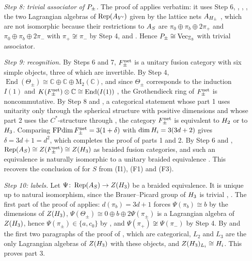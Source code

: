 \documentclass[leqno]{article}
\newcommand{\Cbb}{\ensuremath{\mathbb{C}}}
\newcommand{\M}{\mathrm{M}}
\let\cal\relax
\newcommand{\cal}{\mathcal}
\newcommand{\Z}{\ensuremath{\mathbb{Z}}}
\newcommand{\co}{\colon}
\newcommand{\ot}{\otimes}
\DeclareMathOperator{\Rep}{Rep}
\numberwithin{equation}{section}
\begin{document}
\emph{Step 8: trivial associator of $\cal P_\pm$.} The proof of \cite[Lemma 6.10]{ArhII} applies verbatim: it uses Step 6, \cite[Corollary 4.1 and Theorem 4.10]{DMNO13}, \cite[Proposition 2.2(5)]{ArhII}, \cite[Proposition 6.4]{BKL15}, the two Lagrangian algebras of $\Rep(\cal A_{V'})$ given by the lattice nets $\cal A_{H_\pm}$ \cite[Proposition 4.3(2) and Theorem 4.5]{ArhII}, which are not isomorphic because their restrictions to $\cal A_S$ are $\pi_0 \oplus \pi_b \oplus 2\pi_+$ and $\pi_0 \oplus \pi_b \oplus 2\pi_-$ with $\pi_+ \not\cong \pi_-$ by Step 4, \cite[Proposition 4.8]{DMNO13} and \cite[Lemma 6.7(2)]{ArhII}. Hence $\cal P_\pm \cong \mathrm{Vec}_{\Z_3}$ with trivial associator.

\emph{Step 9: recognition.} By Steps 6 and 7, $\cal F^{\mathrm{net}}_\pm$ is a unitary fusion category with six simple objects, three of which are invertible. By Step 4, $\operatorname{End}(\Theta_\pm) \cong \Cbb \oplus \Cbb \oplus \M_2(\Cbb)$, and since $\Theta_\pm$ corresponds to the induction $I(1)$ \cite[Lemma 3.1]{ArhII} and $K(\cal F^{\mathrm{net}}_\pm) \ot \Cbb \cong \operatorname{End}(I(1))$ \cite[Corollary 2.16]{Ost15}, the Grothendieck ring of $\cal F^{\mathrm{net}}_\pm$ is noncommutative. By Step 8 and \cite[Theorem 6.1]{ArhII}, a categorical statement whose part 1 uses unitarity only through the spherical structure with positive dimensions and whose part 2 uses the $C^*$-structure through \cite[Theorems 5.9 and 9.1]{Izu18}, the category $\cal F^{\mathrm{net}}_\pm$ is equivalent to $\cal H_2$ or to $\cal H_3$. Comparing $\operatorname{FPdim}\cal F^{\mathrm{net}}_\pm = 3(1+\delta)$ with $\dim\cal H_i = 3(3d+2)$ gives $\delta = 3d+1 = d^2$, which completes the proof of parts 1 and 2. By Step 6 and \cite[Theorem 3.1]{ENO11}, $\Rep(\cal A_S) \cong Z(\cal F^{\mathrm{net}}_\pm) \cong Z(\cal H_3)$ as braided fusion categories, and such an equivalence is naturally isomorphic to a unitary braided equivalence \cite[Theorem 5]{Reu23}. This recovers the conclusion of \cite[Theorem 6.11]{ArhII} for $S$ from (I1), (F1) and (F3).

\emph{Step 10: labels.} Let $\Psi \co \Rep(\cal A_S) \to Z(\cal H_3)$ be a braided equivalence. It is unique up to natural isomorphism, since the Brauer--Picard group of $\cal H_3$ is trivial \cite[Theorem 1.5]{GrS12}, \cite[Theorem 1.1]{ENO10}. The first part of the proof of \cite[Lemma 7.1]{ArhII} applies: $d(\pi_b) = 3d+1$ forces $\Psi(\pi_b) \cong b$ by the dimensions of $Z(\cal H_3)$, $\Psi(\Theta_\pm) \cong 0 \oplus b \oplus 2\Psi(\pi_\pm)$ is a Lagrangian algebra of $Z(\cal H_3)$, hence $\Psi(\pi_\pm) \in \{a,c_0\}$ by \cite[Lemma 3.2]{ArhII}, and $\Psi(\pi_+) \not\cong \Psi(\pi_-)$ by Step 4. By \cite[Proposition 3.3]{ArhII} and the first two paragraphs of the proof of \cite[Proposition 3.6]{ArhII}, which are categorical, $L_2$ and $L_3$ are the only Lagrangian algebras of $Z(\cal H_3)$ with these objects, and $Z(\cal H_3)_{L_i} \cong \cal H_i$. This proves part 3.
\end{document}
